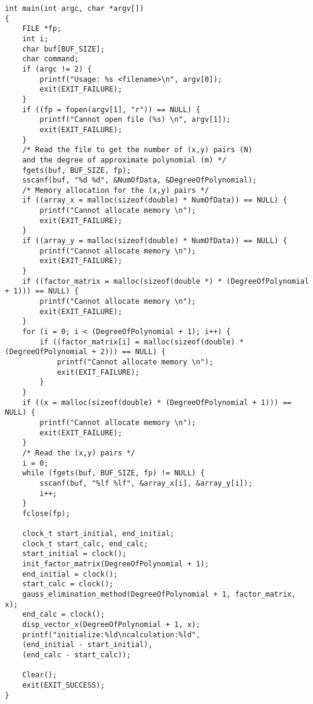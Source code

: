 \begin{lstlisting}[caption=lsm\_polynomial.c,label=lsm]
int main(int argc, char *argv[])
{
    FILE *fp;
    int i;
    char buf[BUF_SIZE];
    char command;
    if (argc != 2) {
        printf("Usage: %s <filename>\n", argv[0]);
        exit(EXIT_FAILURE);
    }
    if ((fp = fopen(argv[1], "r")) == NULL) {
        printf("Cannot open file (%s) \n", argv[1]);
        exit(EXIT_FAILURE);
    }
    /* Read the file to get the number of (x,y) pairs (N) 
    and the degree of approximate polynomial (m) */
    fgets(buf, BUF_SIZE, fp);
    sscanf(buf, "%d %d", &NumOfData, &DegreeOfPolynomial);
    /* Memory allocation for the (x,y) pairs */
    if ((array_x = malloc(sizeof(double) * NumOfData)) == NULL) {
        printf("Cannot allocate memory \n");
        exit(EXIT_FAILURE);
    }
    if ((array_y = malloc(sizeof(double) * NumOfData)) == NULL) {
        printf("Cannot allocate memory \n");
        exit(EXIT_FAILURE);
    }
    if ((factor_matrix = malloc(sizeof(double *) * (DegreeOfPolynomial + 1))) == NULL) {
        printf("Cannot allocate memory \n");
        exit(EXIT_FAILURE);
    }
    for (i = 0; i < (DegreeOfPolynomial + 1); i++) {
        if ((factor_matrix[i] = malloc(sizeof(double) * (DegreeOfPolynomial + 2))) == NULL) {
            printf("Cannot allocate memory \n");
            exit(EXIT_FAILURE);
        }
    }
    if ((x = malloc(sizeof(double) * (DegreeOfPolynomial + 1))) == NULL) {
        printf("Cannot allocate memory \n");
        exit(EXIT_FAILURE);
    }
    /* Read the (x,y) pairs */
    i = 0;
    while (fgets(buf, BUF_SIZE, fp) != NULL) {
        sscanf(buf, "%lf %lf", &array_x[i], &array_y[i]);
        i++;
    }
    fclose(fp);

    clock_t start_initial, end_initial;
    clock_t start_calc, end_calc;
    start_initial = clock();
    init_factor_matrix(DegreeOfPolynomial + 1);
    end_initial = clock();
    start_calc = clock();
    gauss_elimination_method(DegreeOfPolynomial + 1, factor_matrix, x);
    end_calc = clock();
    disp_vector_x(DegreeOfPolynomial + 1, x);
    printf("initialize:%ld\ncalculation:%ld",
    (end_initial - start_initial),
    (end_calc - start_calc));

    Clear();
    exit(EXIT_SUCCESS);
}  
\end{lstlisting}
